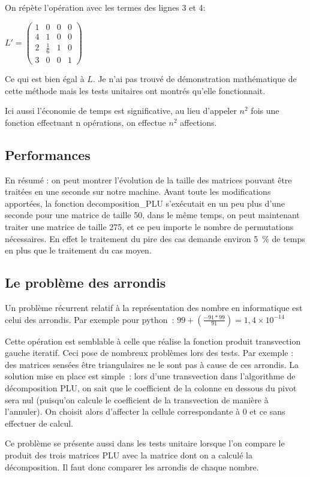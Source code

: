 \documentclass[11pt]{article}
\begin{document}
On répète l'opération avec les termes des lignes 3 et 4:

$L' = 
\begin{pmatrix}
1&0&0&0\\
4&1&0&0\\
2&\frac{1}{6}&1&0\\
3&0&0&1
\end{pmatrix}
$

Ce qui est bien égal à $L$. Je n'ai pas trouvé de démonstration mathématique de cette méthode mais les tests unitaires ont montrés qu'elle fonctionnait.

Ici aussi l'économie de temps est significative, au lieu d'appeler $n^2$ fois une fonction effectuant n opérations, on effectue $n^2$ affections.

\subsection{Performances}
En résumé : on peut montrer l'évolution de la taille des matrices pouvant être traitées en une seconde sur notre machine. Avant toute les modifications apportées, la fonction decomposition\_PLU s'exécutait en un peu plus d'une seconde pour une matrice de taille 50, dans le même temps, on peut maintenant traiter une matrice de taille 275, et ce peu importe le nombre de permutations nécessaires. En effet le traitement du pire des cas demande environ 5 \% de temps en plus que le traitement du cas moyen.

\subsection{Le problème des arrondis}
Un problème récurrent relatif à la représentation des nombre en informatique est celui des arrondis. Par exemple pour python : 
$99 + ( \frac{-91*99}{91}) = 1,4 \times 10^{-14}$

Cette opération est semblable à celle que réalise la fonction produit transvection gauche iteratif. Ceci pose de nombreux problèmes lors des tests. Par exemple : des matrices sensées être triangulaires ne le sont pas à cause de ces arrondis. La solution mise en place est simple : lors d'une transvection dans l'algorithme de décomposition PLU, on sait que le coefficient de la colonne en dessous du pivot sera nul (puisqu'on calcule le coefficient de la transvection de manière à l'annuler). On choisit alors d'affecter la cellule correspondante à 0 et ce sans effectuer de calcul.

Ce problème se présente aussi dans les tests unitaire lorsque l'on compare le produit des trois matrices PLU avec la matrice dont on a calculé la décomposition. Il faut donc comparer les arrondis de chaque nombre.
\end{document}
